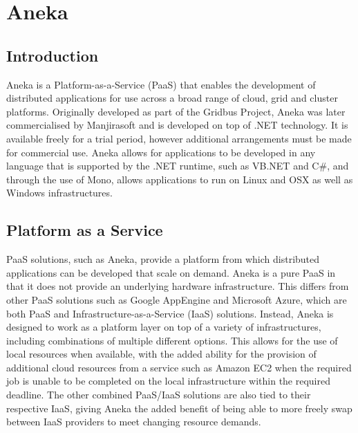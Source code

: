 \chapter{Aneka}
\section{Introduction}
Aneka is a Platform-as-a-Service (PaaS) that enables the development of distributed applications for use across a broad range of cloud, grid and cluster platforms. Originally developed as part of the Gridbus Project, Aneka was later commercialised by Manjirasoft and is developed on top of .NET technology. It is available freely for a trial period, however additional arrangements must be made for commercial use. Aneka allows for applications to be developed in any language that is supported by the .NET runtime, such as VB.NET and C\#, and through the use of Mono, allows applications to run on Linux and OSX as well as Windows infrastructures.

\section{Platform as a Service}
PaaS solutions, such as Aneka, provide a platform from which distributed applications can be developed that scale on demand. Aneka is a pure PaaS in that it does not provide an underlying hardware infrastructure. This differs from other PaaS solutions such as Google AppEngine and Microsoft Azure, which are both PaaS and Infrastructure-as-a-Service (IaaS) solutions. Instead, Aneka is designed to work as a platform layer on top of a variety of infrastructures, including combinations of multiple different options. This allows for the use of local resources when available, with the added ability for the provision of additional cloud resources from a service such as Amazon EC2 when the required job is unable to be completed on the local infrastructure within the required deadline. The other combined PaaS/IaaS solutions are also tied to their respective IaaS, giving Aneka the added benefit of being able to more freely swap between IaaS providers to meet changing resource demands.

